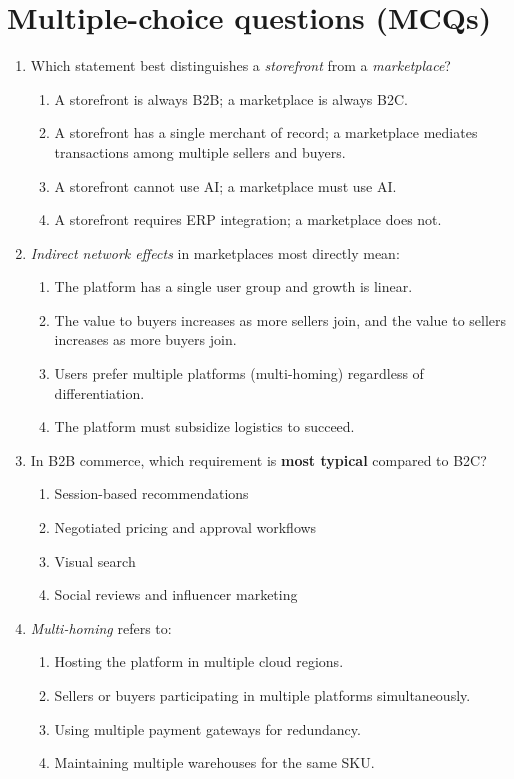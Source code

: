\section{Multiple-choice questions (MCQs)}
\begin{enumerate}
  \item Which statement best distinguishes a \emph{storefront} from a \emph{marketplace}?
  \begin{enumerate}
    \item A storefront is always B2B; a marketplace is always B2C.
    \item A storefront has a single merchant of record; a marketplace mediates transactions among multiple sellers and buyers.
    \item A storefront cannot use AI; a marketplace must use AI.
    \item A storefront requires ERP integration; a marketplace does not.
  \end{enumerate}

  \item \emph{Indirect network effects} in marketplaces most directly mean:
  \begin{enumerate}
    \item The platform has a single user group and growth is linear.
    \item The value to buyers increases as more sellers join, and the value to sellers increases as more buyers join.
    \item Users prefer multiple platforms (multi-homing) regardless of differentiation.
    \item The platform must subsidize logistics to succeed.
  \end{enumerate}

  \item In B2B commerce, which requirement is \textbf{most typical} compared to B2C?
  \begin{enumerate}
    \item Session-based recommendations
    \item Negotiated pricing and approval workflows
    \item Visual search
    \item Social reviews and influencer marketing
  \end{enumerate}

  \item \emph{Multi-homing} refers to:
  \begin{enumerate}
    \item Hosting the platform in multiple cloud regions.
    \item Sellers or buyers participating in multiple platforms simultaneously.
    \item Using multiple payment gateways for redundancy.
    \item Maintaining multiple warehouses for the same SKU.
  \end{enumerate}


\end{enumerate}
